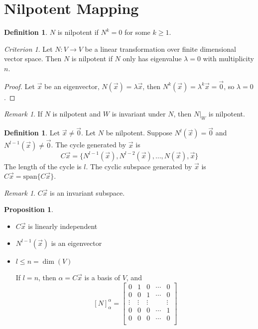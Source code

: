 \documentclass{article}
\theoremstyle{definition}
\newtheorem{proposition}[theorem]{Proposition}
\newtheorem{definition}[theorem]{Definition}
\theoremstyle{remark}
\newtheorem{remark}[theorem]{Remark}
\newtheorem{criterion}[theorem]{Criterion}
\begin{document}
\section{Nilpotent Mapping}

\begin{definition}
    $N$ is nilpotent if $N^k=0$ for some $k\geq 1$.
\end{definition}

\begin{criterion}
    Let $N:V\rightarrow V$ be a linear transformation over finite dimensional vector space. Then $N$ is nilpotent if $N$ only has eigenvalue $\lambda=0$ with multiplicity $n$.
\end{criterion}

\begin{proof}
    Let $\vec{x}$ be an eigenvector, $N(\vec{x})=\lambda\vec{x}$, then $N^k(\vec{x})=\lambda^k\vec{x}=\vec{0}$, so $\lambda=0$.
\end{proof}

\begin{remark}
    If $N$ is nilpotent and $W$ is invariant under $N$, then $N|_W$ is nilpotent.
\end{remark}


\begin{definition}
    Let $\vec{x}\neq\vec{0}$.
    Let $N$ be nilpotent.
    Suppose $N^l(\vec{x})=\vec{0}$ and $N^{l-1}(\vec{x})\neq \vec{0}$.
    The cycle generated by $\vec{x}$ is 
    \[
    C\vec{x}=\{N^{l-1}(\vec{x}),N^{l-2}(\vec{x}),\dots, N(\vec{x}),\vec{x}\}
    \]
    The length of the cycle is $l$.
    The cyclic subspace generated by $\vec{x}$ is $C\vec{x}=\text{span}\{C\vec{x}\}$.
\end{definition}
\begin{remark}
    $C\vec{x}$ is an invariant subspace.
\end{remark}

\begin{proposition}
    \begin{itemize}
        \item $C\vec{x}$ is linearly independent
        \item $N^{l-1}(\vec{x})$ is an eigenvector
        \item $l\leq n=\dim(V)$

        If $l=n$, then $\alpha=C\vec{x}$ is a basis of $V$, and 
        \[
        [N]_{\alpha}^{\alpha}=\begin{bmatrix}
            0&1&0&\cdots &0\\
            0&0&1&\cdots &0\\
            \vdots&\vdots&\vdots&&\vdots\\
            0&0&0&\cdots &1\\
            0&0&0&\cdots &0\\
        \end{bmatrix}
        \]
    \end{itemize}
\end{proposition}
\end{document}
